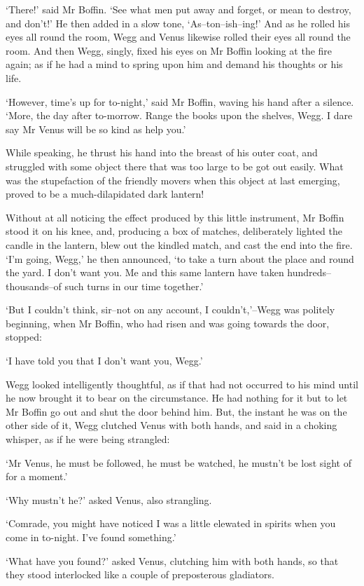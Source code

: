 ‘There!’ said Mr Boffin. ‘See what men put away and forget, or mean to
destroy, and don’t!’ He then added in a slow tone, ‘As--ton--ish--ing!’
And as he rolled his eyes all round the room, Wegg and Venus likewise
rolled their eyes all round the room. And then Wegg, singly, fixed his
eyes on Mr Boffin looking at the fire again; as if he had a mind to
spring upon him and demand his thoughts or his life.

‘However, time’s up for to-night,’ said Mr Boffin, waving his hand after
a silence. ‘More, the day after to-morrow. Range the books upon the
shelves, Wegg. I dare say Mr Venus will be so kind as help you.’

While speaking, he thrust his hand into the breast of his outer coat,
and struggled with some object there that was too large to be got out
easily. What was the stupefaction of the friendly movers when this
object at last emerging, proved to be a much-dilapidated dark lantern!

Without at all noticing the effect produced by this little instrument,
Mr Boffin stood it on his knee, and, producing a box of matches,
deliberately lighted the candle in the lantern, blew out the kindled
match, and cast the end into the fire. ‘I’m going, Wegg,’ he then
announced, ‘to take a turn about the place and round the yard. I don’t
want you. Me and this same lantern have taken hundreds--thousands--of
such turns in our time together.’

‘But I couldn’t think, sir--not on any account, I couldn’t,’--Wegg was
politely beginning, when Mr Boffin, who had risen and was going towards
the door, stopped:

‘I have told you that I don’t want you, Wegg.’

Wegg looked intelligently thoughtful, as if that had not occurred to his
mind until he now brought it to bear on the circumstance. He had nothing
for it but to let Mr Boffin go out and shut the door behind him. But,
the instant he was on the other side of it, Wegg clutched Venus
with both hands, and said in a choking whisper, as if he were being
strangled:

‘Mr Venus, he must be followed, he must be watched, he mustn’t be lost
sight of for a moment.’

‘Why mustn’t he?’ asked Venus, also strangling.

‘Comrade, you might have noticed I was a little elewated in spirits when
you come in to-night. I’ve found something.’

‘What have you found?’ asked Venus, clutching him with both hands, so
that they stood interlocked like a couple of preposterous gladiators.

